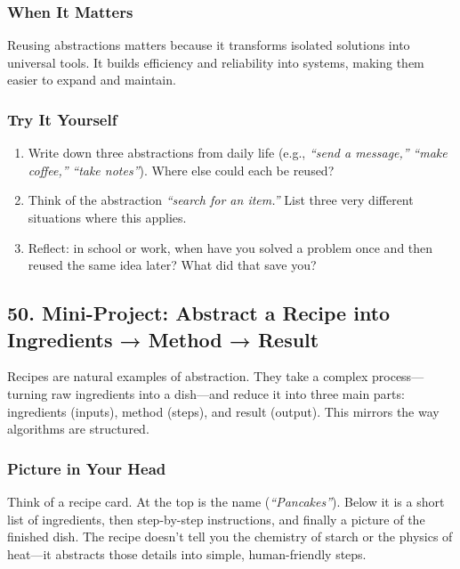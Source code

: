 \documentclass[
  letterpaper,
  DIV=11,
  numbers=noendperiod]{scrreprt}
\providecommand{\tightlist}{%
  \setlength{\itemsep}{0pt}\setlength{\parskip}{0pt}}
\begin{document}
\subsubsection{When It Matters}\label{when-it-matters-46}

Reusing abstractions matters because it transforms isolated solutions
into universal tools. It builds efficiency and reliability into systems,
making them easier to expand and maintain.

\subsubsection{Try It Yourself}\label{try-it-yourself-48}

\begin{enumerate}
\def\labelenumi{\arabic{enumi}.}
\tightlist
\item
  Write down three abstractions from daily life (e.g., \emph{``send a
  message,''} \emph{``make coffee,''} \emph{``take notes''}). Where else
  could each be reused?
\item
  Think of the abstraction \emph{``search for an item.''} List three
  very different situations where this applies.
\item
  Reflect: in school or work, when have you solved a problem once and
  then reused the same idea later? What did that save you?
\end{enumerate}

\subsection{50. Mini-Project: Abstract a Recipe into Ingredients →
Method →
Result}\label{mini-project-abstract-a-recipe-into-ingredients-method-result}

Recipes are natural examples of abstraction. They take a complex
process---turning raw ingredients into a dish---and reduce it into three
main parts: ingredients (inputs), method (steps), and result (output).
This mirrors the way algorithms are structured.

\subsubsection{Picture in Your Head}\label{picture-in-your-head-49}

Think of a recipe card. At the top is the name (\emph{``Pancakes''}).
Below it is a short list of ingredients, then step-by-step instructions,
and finally a picture of the finished dish. The recipe doesn't tell you
the chemistry of starch or the physics of heat---it abstracts those
details into simple, human-friendly steps.
\end{document}
